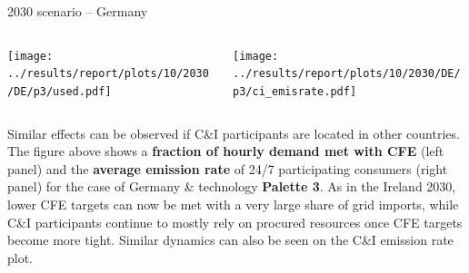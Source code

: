 \begin{frame}{2030 scenario -- Germany}

  {\footnotesize

  \begin{columns}
  \begin{column}{7cm}
  \centering
  \texttt{[image: ../results/report/plots/10/2030/DE/p3/used.pdf]}
  \end{column}

  \begin{column}{8cm}
  \centering
  \texttt{[image: ../results/report/plots/10/2030/DE/p3/ci\_emisrate.pdf]}
  \end{column}

  \end{columns}

  \begin{columns}
  \begin{column}{15cm}
  Similar effects can be observed if C\&I participants are located in other countries. 
  The figure above shows a {\bf fraction of hourly demand met with CFE} (left panel) 
  and the {\bf average emission rate} of 24/7 participating consumers (right panel) 
  for the case of Germany \& technology {\bf Palette 3}.
  As in the Ireland 2030, lower CFE targets can now be met with a very large share of grid imports,
  while C\&I participants continue to mostly rely on procured resources once CFE targets become 
  more tight. Similar dynamics can also be seen on the C\&I emission rate plot. 

  \end{column}
  \end{columns}
  }

\end{frame}


